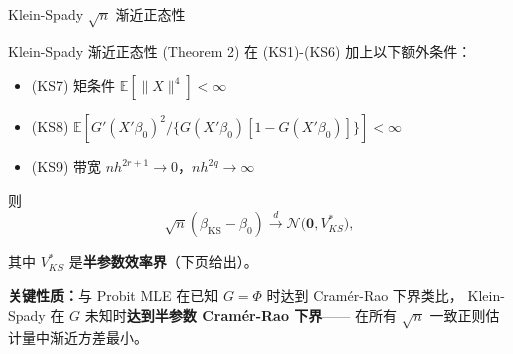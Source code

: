 \documentclass[aspectratio=169, 10pt]{beamer}
\begin{document}
\begin{frame}{Klein-Spady $\sqrt{n}$ 渐近正态性}

  \begin{definitionbox}{{Klein-Spady 渐近正态性 (Theorem 2)}}
    在 (KS1)-(KS6) 加上以下额外条件：
    \begin{itemize}\setlength{\itemsep}{1pt}
      \item (KS7) 矩条件 $\mathbb{E}[\|X\|^4] < \infty$
      \item (KS8) $\mathbb{E}[G'(X'\beta_0)^2 / \{G(X'\beta_0)[1-G(X'\beta_0)]\}] < \infty$
      \item (KS9) 带宽 $nh^{2r+1} \to 0$，$nh^{2q} \to \infty$
    \end{itemize}

    则
    $$\sqrt{n}(\hat\beta_{\text{KS}} - \beta_0) \overset{d}{\to}
    \mathcal{N}\!\bigl(\mathbf{0}, V^{*}_{KS}\bigr),$$

    其中 $V^{*}_{KS}$ 是\textbf{半参数效率界}（下页给出）。
  \end{definitionbox}

  \begin{highlightbox}
    \textbf{关键性质：}与 Probit MLE 在已知 $G = \Phi$ 时达到 Cramér-Rao 下界类比，
    Klein-Spady 在 $G$ 未知时\textbf{达到半参数 Cramér-Rao 下界}——
    在所有 $\sqrt{n}$ 一致正则估计量中渐近方差最小。
  \end{highlightbox}

  \hypertarget{main-c9}{}
  \hfill{\scriptsize\hyperlink{proof-c9}{}}

\end{frame}
\end{document}
